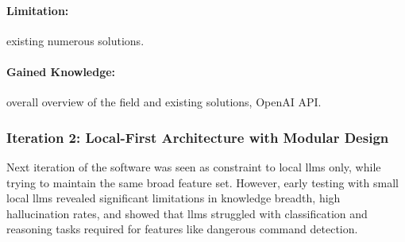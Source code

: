 \paragraph{Limitation:} existing numerous solutions.
\paragraph{Gained Knowledge:} overall overview of the field and
existing solutions,
OpenAI API.

\subsubsection{Iteration 2: Local-First Architecture with Modular Design}
Next iteration of the software was seen as constraint to local \glspl{llm} only,
while trying to maintain the same broad feature set. However, early testing with
small local \glspl{llm} revealed significant limitations in knowledge breadth,
high hallucination rates, and showed that \glspl{llm} struggled with
classification and reasoning tasks required for features like dangerous command
detection.

